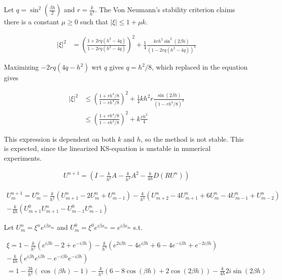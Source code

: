 Let $q = \sin^2(\frac{\beta h}{2})$ and $r = \frac{k}{h^4}$. The Von Neumann's stability criterion claims there is a constant $\mu \ge 0$ such that $|\xi| \le 1+ \mu k$. 

\begin{align*}
|\xi|^2 &= \left(\frac{1+2rq(h^2-4q)}{1 - 2rq(h^2-4q)}\right)^2 + \frac{1}{4}\frac{krh^2\sin^2(2\beta h)}{\left(1 - 2rq(h^2-4q)\right)^2}
\end{align*}

Maximizing $-2rq(4q-h^2)$ wrt $q$ gives $q = h^2/8$, which replaced in the equation gives

\begin{align*}
|\xi |^2 &\le \left(\frac{1+rh^4/8}{1-rh^4/8}\right)^2 + \frac{1}{4}kh^2r \frac{\sin(2\beta h)}{(1-rh^4/8)^2} \\
&\le \left(\frac{1+rh^4/8}{1-rh^4/8}\right)^2 + k\frac{rh^2}{4}
\end{align*}

This expression is dependent on both $k$ and $h$, so the method is not stable. This is expected, since the linearized KS-equation is unstable in numerical experiments. 


















\large
\begin{align*}
U^{n+1} = (I - \frac{k}{h^2}A - \frac{k}{h^4}A^2 - \frac{k}{4h} D(RU^{n})) 
\end{align*}

\begin{align*}
U^{n+1}_m = U^n_m - \frac{k}{h^2}(U_{m+1}^n-2U_{m}^n+U_{m-1}^n)
- \frac{k}{h^4}(U_{m+2}^n-4U_{m+1}^n+6U_m^n-4U_{m-1}^n+U_{m-2}^n) \\
- \frac{k}{4h}(U_{m+1}^0 U_{m+1}^n-U_{m-1}^0 U_{m-1}^n) 
\end{align*}

Let $U_m^n = \xi^n e^{i \beta x_m}$ and $U_{m}^0 = \xi^0 e^{i\beta x_m} = e^{i\beta x_m}$ s.t.

\begin{align*}
\xi = 1 - \frac{k}{h^2}(e^{i\beta h}-2+e^{-i\beta h}) - \frac{k}{h^4}(e^{2i\beta h}-4e^{i\beta h}+6-4e^{-i\beta h}+e^{-2i\beta h}) \\
 - \frac{k}{4h}(e^{i\beta h}e^{i\beta h} - e^{-i\beta h}e^{-i\beta h})\\
 = 1-\frac{2k}{h^2}(\cos(\beta h)-1) - \frac{k}{h^4}(6-8\cos(\beta h)+2\cos(2\beta h)) - \frac{k}{4h}2i\sin(2\beta h)
\end{align*}

